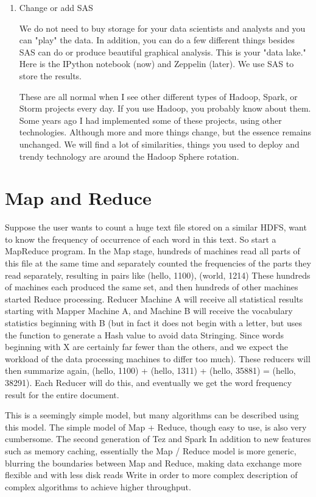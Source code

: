 \documentclass[sigconf]{acmart}
\begin{document}
\begin{enumerate}
  \item  Change or add SAS
  \par We do not need to buy storage for your data scientists and analysts and you can "play" the data. In addition, you can do a few different things besides SAS can do or produce beautiful graphical analysis. This is your "data lake." Here is the IPython notebook (now) and Zeppelin (later). We use SAS to store the results.
  \par These are all normal when I see other different types of Hadoop, Spark, or Storm projects every day. If you use Hadoop, you probably know about them. Some years ago I had implemented some of these projects, using other technologies. Although more and more things change, but the essence remains unchanged. We will find a lot of similarities, things you used to deploy and trendy technology are around the Hadoop Sphere rotation.

 

\end{enumerate}

\section{Map and Reduce}
 Suppose the user wants to count a huge text file stored on a similar HDFS, want to know the frequency of occurrence of each word in this text. So start a MapReduce program. In the Map stage, hundreds of machines read all parts of this file at the same time and separately counted the frequencies of the parts they read separately, resulting in pairs like (hello, 1100), (world, 1214) These hundreds of machines each produced the same set, and then hundreds of other machines started Reduce processing. Reducer Machine A will receive all statistical results starting with Mapper Machine A, and Machine B will receive the vocabulary statistics beginning with B (but in fact it does not begin with a letter, but uses the function to generate a Hash value to avoid data Stringing. Since words beginning with X are certainly far fewer than the others, and we expect the workload of the data processing machines to differ too much). These reducers will then summarize again, (hello, 1100) + (hello, 1311) + (hello, 35881) = (hello, 38291). Each Reducer will do this, and eventually we get the word frequency result for the entire document.

\par This is a seemingly simple model, but many algorithms can be described using this model. The simple model of Map + Reduce, though easy to use, is also very cumbersome. The second generation of Tez and Spark In addition to new features such as memory caching, essentially the Map / Reduce model is more generic, blurring the boundaries between Map and Reduce, making data exchange more flexible and with less disk reads Write in order to more complex description of complex algorithms to achieve higher throughput.
\end{document}
